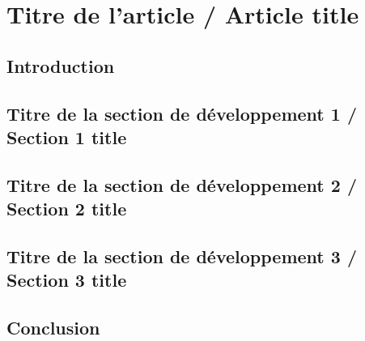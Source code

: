 \chapter{Titre de l'article / Article title}
\thispagestyle{empty} %

\section*{\HECtdmResumeArticle}


\section{Introduction}


\section{Titre de la section de développement 1 / Section 1 title}


\section{Titre de la section de développement 2 / Section 2 title}


\section{Titre de la section de développement 3 / Section 3 title}


\section{Conclusion}




